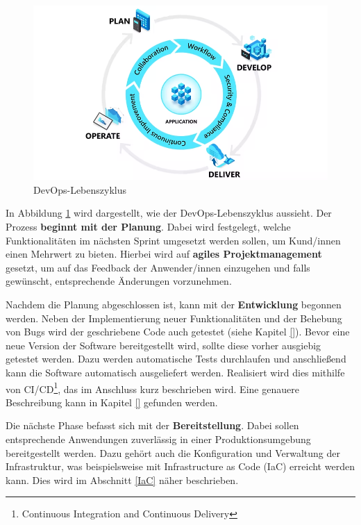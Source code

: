     \begin{figure}[H]
        \centering
        \includegraphics[width=0.9\linewidth]{images/EA/devops-lifecycle.png}
        \caption{DevOps-Lebenszyklus \\ \cite{EA:Web37}}
        \label{fig:devops-lifecycle}
    \end{figure}
      
    In Abbildung \ref{fig:devops-lifecycle} wird dargestellt, wie der DevOps-Lebenszyklus aussieht.
    Der Prozess \textbf{beginnt mit der Planung}. Dabei wird festgelegt, welche Funktionalitäten im nächsten Sprint umgesetzt werden sollen, um Kund/innen einen Mehrwert zu bieten. Hierbei wird auf \textbf{agiles Projektmanagement} gesetzt, um auf das Feedback der Anwender/innen einzugehen und falls gewünscht, entsprechende Änderungen vorzunehmen.
    
    Nachdem die Planung abgeschlossen ist, kann mit der \textbf{Entwicklung} begonnen werden. Neben der Implementierung neuer Funktionalitäten und der Behebung von Bugs wird der geschriebene Code auch getestet (siehe Kapitel \ref{}). Bevor eine neue Version der Software bereitgestellt wird, sollte diese vorher ausgiebig getestet werden. Dazu werden automatische Tests durchlaufen und anschließend kann die Software automatisch ausgeliefert werden. Realisiert wird dies mithilfe von CI/CD\footnote{Continuous Integration and Continuous Delivery}, das im Anschluss kurz beschrieben wird. Eine genauere Beschreibung kann in Kapitel \ref{} gefunden werden.

    \clearpage

    Die nächste Phase befasst sich mit der \textbf{Bereitstellung}. Dabei sollen entsprechende Anwendungen zuverlässig in einer Produktionsumgebung bereitgestellt werden. Dazu gehört auch die Konfiguration und Verwaltung der Infrastruktur, was beispielsweise mit Infrastructure as Code (IaC) erreicht werden kann. Dies wird im Abschnitt \ref{IaC} näher beschrieben.

